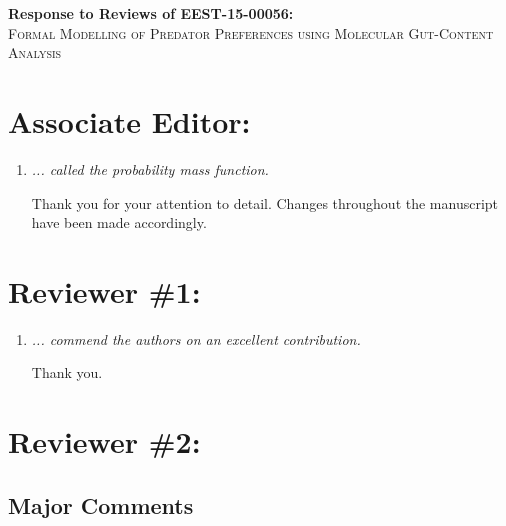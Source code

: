 \documentclass[12pt]{article}
\begin{document}
\begin{center}
  \begin{Large}
    \textbf{Response to Reviews of EEST-15-00056:}\\
    \textsc{Formal Modelling of Predator Preferences using Molecular Gut-Content
      Analysis}
  \end{Large}
\end{center}

\section{Associate Editor:} 

\begin{enumerate}
\item \textit{ ... called the probability mass function.}

Thank you for your attention to detail.  Changes throughout the manuscript have been made accordingly.


\end{enumerate}
\section{Reviewer \#1:}
\begin{enumerate}
\item  \textit{ ... commend the authors on an excellent contribution.}

  Thank you.

\end{enumerate}

\section{Reviewer \#2:}

\subsection{Major Comments}
\end{document}
